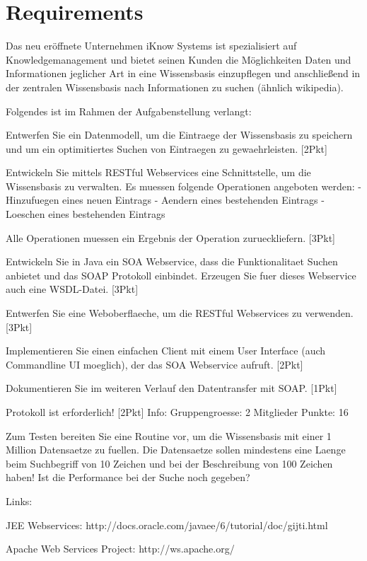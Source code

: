 \documentclass[11pt, a4paper]{article}
\begin{document}
\section{Requirements}

Das neu eröffnete Unternehmen iKnow Systems ist spezialisiert auf
Knowledgemanagement und bietet seinen Kunden die Möglichkeiten Daten und
Informationen jeglicher Art in eine Wissensbasis einzupflegen und anschließend
in der zentralen Wissensbasis nach Informationen zu suchen (ähnlich wikipedia).

Folgendes ist im Rahmen der Aufgabenstellung verlangt:

Entwerfen Sie ein Datenmodell, um die Eintraege der Wissensbasis zu speichern
und um ein optimitiertes Suchen von Eintraegen zu gewaehrleisten. [2Pkt]

Entwickeln Sie mittels RESTful Webservices eine Schnittstelle, um die
Wissensbasis zu verwalten. Es muessen folgende Operationen angeboten werden: -
Hinzufuegen eines neuen Eintrags - Aendern eines bestehenden Eintrags -
Loeschen eines bestehenden Eintrags

Alle Operationen muessen ein Ergebnis der Operation zurueckliefern. [3Pkt]

Entwickeln Sie in Java ein SOA Webservice, dass die Funktionalitaet Suchen
anbietet und das SOAP Protokoll einbindet. Erzeugen Sie fuer dieses Webservice
auch eine WSDL-Datei. [3Pkt]

Entwerfen Sie eine Weboberflaeche, um die RESTful Webservices zu verwenden.
[3Pkt]

Implementieren Sie einen einfachen Client mit einem User Interface (auch
Commandline UI moeglich), der das SOA Webservice aufruft. [2Pkt]

Dokumentieren Sie im weiteren Verlauf den Datentransfer mit SOAP. [1Pkt]

Protokoll ist erforderlich! [2Pkt] Info: Gruppengroesse: 2 Mitglieder Punkte:
16

Zum Testen bereiten Sie eine Routine vor, um die Wissensbasis mit einer 1
Million Datensaetze zu fuellen. Die Datensaetze sollen mindestens eine Laenge
beim Suchbegriff von 10 Zeichen und bei der Beschreibung von 100 Zeichen haben!
Ist die Performance bei der Suche noch gegeben?

Links:

JEE Webservices: http://docs.oracle.com/javaee/6/tutorial/doc/gijti.html

Apache Web Services Project: http://ws.apache.org/
\end{document}
